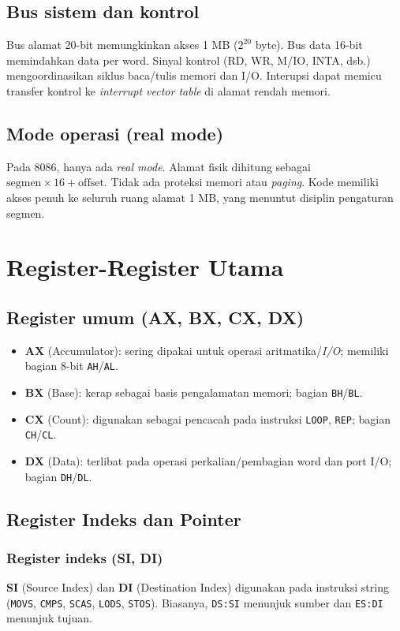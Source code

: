 \subsection{Bus sistem dan kontrol}
Bus alamat 20-bit memungkinkan akses 1 MB (\(2^{20}\) byte). Bus data 16-bit memindahkan data per word. Sinyal kontrol (RD, WR, M/IO, INTA, dsb.) mengoordinasikan siklus baca/tulis memori dan I/O. Interupsi dapat memicu transfer kontrol ke \textit{interrupt vector table} di alamat rendah memori.

\subsection{Mode operasi (real mode)}
Pada 8086, hanya ada \textit{real mode}. Alamat fisik dihitung sebagai \(\text{segmen} \times 16 + \text{offset}\). Tidak ada proteksi memori atau \textit{paging}. Kode memiliki akses penuh ke seluruh ruang alamat 1 MB, yang menuntut disiplin pengaturan segmen.

\section{Register-Register Utama}
\subsection{Register umum (AX, BX, CX, DX)}
\begin{itemize}
    \item \textbf{AX} (Accumulator): sering dipakai untuk operasi aritmatika/\textit{I/O}; memiliki bagian 8-bit \texttt{AH}/\texttt{AL}.
    \item \textbf{BX} (Base): kerap sebagai basis pengalamatan memori; bagian \texttt{BH}/\texttt{BL}.
    \item \textbf{CX} (Count): digunakan sebagai pencacah pada instruksi \texttt{LOOP}, \texttt{REP}; bagian \texttt{CH}/\texttt{CL}.
    \item \textbf{DX} (Data): terlibat pada operasi perkalian/pembagian word dan port I/O; bagian \texttt{DH}/\texttt{DL}.
\end{itemize}

\subsection{Register Indeks dan Pointer}\label{subsec:arsitektur-indeks-pointer}
\subsubsection{Register indeks (SI, DI)}
\textbf{SI} (Source Index) dan \textbf{DI} (Destination Index) digunakan pada instruksi string (\texttt{MOVS}, \texttt{CMPS}, \texttt{SCAS}, \texttt{LODS}, \texttt{STOS}). Biasanya, \texttt{DS:SI} menunjuk sumber dan \texttt{ES:DI} menunjuk tujuan.

